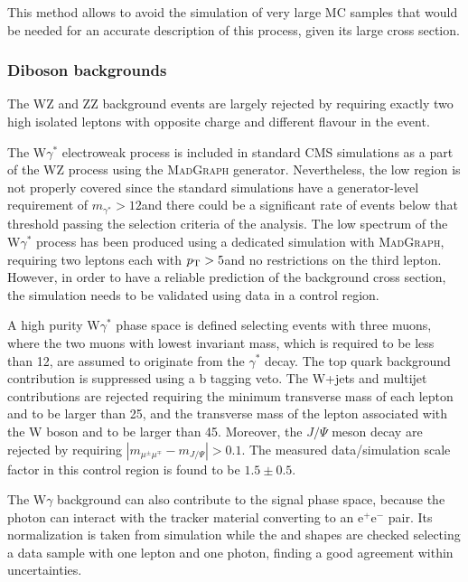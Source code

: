 This method allows to avoid the simulation of very large MC samples that would be needed for an accurate description of this process, given its large cross section. 





\subsubsection{Diboson backgrounds\label{sec:otherbkg}}

The WZ and ZZ background events are largely rejected by requiring exactly two high \pt isolated leptons with opposite charge and different flavour in the event. 

The W$\gamma^*$ electroweak process is included in standard CMS simulations as a part of the WZ
process using the \textsc{MadGraph} generator. Nevertheless, the low \mll region is not properly covered since the standard simulations have a generator-level requirement of $m_{\gamma^*}>12$\GeV and there could be a significant rate of events below that threshold passing the selection criteria of the analysis. The low \mll spectrum of the W$\gamma^*$ process has been produced using a dedicated simulation with \textsc{MadGraph}, requiring two leptons each with $p_\mathrm{T} > 5$\GeV and no restrictions on the third lepton. However, in order to have a reliable prediction of the background cross section, the simulation needs to be validated using data in a control region.

A high purity W$\gamma^*$ phase space is defined selecting events with three muons, where the two muons with lowest invariant mass, which is required to be less than 12\GeV, are assumed to originate from the $\gamma^*$ decay. The top quark background contribution is suppressed using a b tagging veto. The W+jets and multijet contributions are rejected requiring the minimum transverse mass of each lepton and \MET to be larger than 25\GeV, and the transverse mass of the lepton associated with the W boson and \MET to be larger than 45\GeV. Moreover, the $J/\Psi$ meson decay are rejected by requiring $|m_{\mu^{\pm}\mu^{\mp}} - m_{J/\Psi}|>0.1$\GeV.
The measured data/simulation scale factor in this control region is found to be $1.5 \pm 0.5$.

The W$\gamma$ background can also contribute to the signal phase space, because the photon can interact with the tracker material converting to an $\mathrm{e^+e^-}$ pair. Its normalization is taken from simulation while the \mll and \mt shapes are checked selecting a data sample with one lepton and one photon, finding a good agreement within uncertainties.


